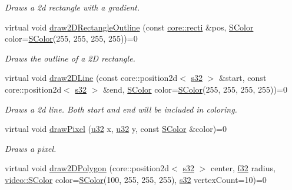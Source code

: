 \begin{DoxyCompactItemize}
\begin{DoxyCompactList}\small\item\em Draws a 2d rectangle with a gradient. \end{DoxyCompactList}\item 
virtual void \hyperlink{classirr_1_1video_1_1IVideoDriver_a65efe36e19f0570988848175a8af7bd1}{draw2\+D\+Rectangle\+Outline} (const \hyperlink{namespaceirr_1_1core_a816a136b99c60f8c739005f7da7de914}{core\+::recti} \&pos, \hyperlink{classirr_1_1video_1_1SColor}{S\+Color} color=\hyperlink{classirr_1_1video_1_1SColor}{S\+Color}(255, 255, 255, 255))=0
\begin{DoxyCompactList}\small\item\em Draws the outline of a 2D rectangle. \end{DoxyCompactList}\item 
virtual void \hyperlink{classirr_1_1video_1_1IVideoDriver_a7b5388e319a0ae1340c3d81db02dd959}{draw2\+D\+Line} (const core\+::position2d$<$ \hyperlink{namespaceirr_ac66849b7a6ed16e30ebede579f9b47c6}{s32} $>$ \&start, const core\+::position2d$<$ \hyperlink{namespaceirr_ac66849b7a6ed16e30ebede579f9b47c6}{s32} $>$ \&end, \hyperlink{classirr_1_1video_1_1SColor}{S\+Color} color=\hyperlink{classirr_1_1video_1_1SColor}{S\+Color}(255, 255, 255, 255))=0
\begin{DoxyCompactList}\small\item\em Draws a 2d line. Both start and end will be included in coloring. \end{DoxyCompactList}\item 
virtual void \hyperlink{classirr_1_1video_1_1IVideoDriver_a6567ced74ed6dc8cb1b325493ae7a093}{draw\+Pixel} (\hyperlink{namespaceirr_a0416a53257075833e7002efd0a18e804}{u32} x, \hyperlink{namespaceirr_a0416a53257075833e7002efd0a18e804}{u32} y, const \hyperlink{classirr_1_1video_1_1SColor}{S\+Color} \&color)=0
\begin{DoxyCompactList}\small\item\em Draws a pixel. \end{DoxyCompactList}\item 
virtual void \hyperlink{classirr_1_1video_1_1IVideoDriver_aaf1318379f3d70c9347cfa853b944ad4}{draw2\+D\+Polygon} (core\+::position2d$<$ \hyperlink{namespaceirr_ac66849b7a6ed16e30ebede579f9b47c6}{s32} $>$ center, \hyperlink{namespaceirr_a0277be98d67dc26ff93b1a6a1d086b07}{f32} radius, \hyperlink{classirr_1_1video_1_1SColor}{video\+::\+S\+Color} color=\hyperlink{classirr_1_1video_1_1SColor}{S\+Color}(100, 255, 255, 255), \hyperlink{namespaceirr_ac66849b7a6ed16e30ebede579f9b47c6}{s32} vertex\+Count=10)=0

\end{DoxyCompactItemize}
